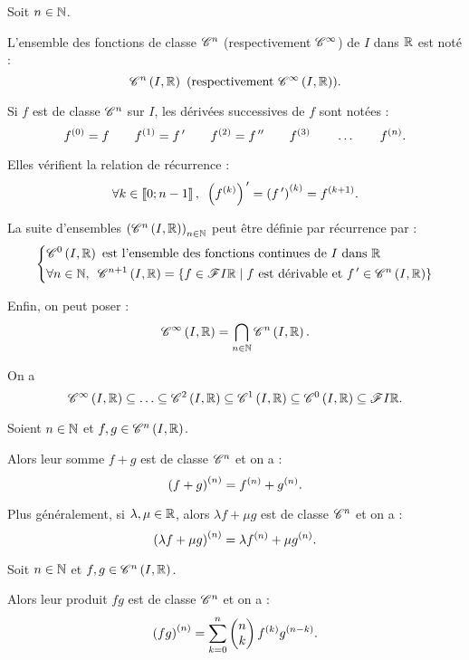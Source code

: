 \begin{nota}
Soit \(n\in\N\).

L'ensemble des fonctions de classe \(\classe{n}\) (respectivement \(\classe{\infty}\)) de \(I\) dans \(\R\) est noté : \[\ensclasse{n}{I}{\R}\text{ (respectivement \(\ensclasse{\infty}{I}{\R}\))}.\]

Si \(f\) est de classe \(\classe{n}\) sur \(I\), les dérivées successives de \(f\) sont notées : \[f\deriv{0}=f\qquad f\deriv{1}=f\prim\qquad f\deriv{2}=f\seconde\qquad f\deriv{3}\qquad\dots\qquad f\deriv{n}.\]

Elles vérifient la relation de récurrence : \[\quantifs{\forall k\in\interventierii{0}{n-1}}\paren{f\deriv{k}}\prim=\paren{f\prim}\deriv{k}=f\deriv{k+1}.\]
\end{nota}

\begin{rem}
La suite d'ensembles \(\paren{\ensclasse{n}{I}{\R}}_{n\in\N}\) peut être définie par récurrence par : \[\begin{dcases}\ensclasse{0}{I}{\R}\text{ est l'ensemble des fonctions continues de \(I\) dans \(\R\)} \\ \quantifs{\forall n\in\N}\ensclasse{n+1}{I}{\R}=\accol{f\in\F{I}{\R}\tq f\text{ est dérivable et }f\prim\in\ensclasse{n}{I}{\R}}\end{dcases}\]

Enfin, on peut poser : \[\ensclasse{\infty}{I}{\R}=\biginter_{n\in\N}\ensclasse{n}{I}{\R}.\]

On a \[\ensclasse{\infty}{I}{\R}\subset\dots\subset\ensclasse{2}{I}{\R}\subset\ensclasse{1}{I}{\R}\subset\ensclasse{0}{I}{\R}\subset\F{I}{\R}.\]
\end{rem}

\begin{prop}
Soient \(n\in\N\) et \(f,g\in\ensclasse{n}{I}{\R}\).

Alors leur somme \(f+g\) est de classe \(\classe{n}\) et on a : \[\paren{f+g}\deriv{n}=f\deriv{n}+g\deriv{n}.\]

Plus généralement, si \(\lambda,\mu\in\R\), alors \(\lambda f+\mu g\) est de classe \(\classe{n}\) et on a : \[\paren{\lambda f+\mu g}\deriv{n}=\lambda f\deriv{n}+\mu g\deriv{n}.\]
\end{prop}

\begin{dem}
\end{dem}

\begin{prop}
Soit \(n\in\N\) et \(f,g\in\ensclasse{n}{I}{\R}\).

Alors leur produit \(fg\) est de classe \(\classe{n}\) et on a : \[\paren{fg}\deriv{n}=\sum_{k=0}^n\binom{k}{n}f\deriv{k}g\deriv{n-k}.\]
\end{prop}

